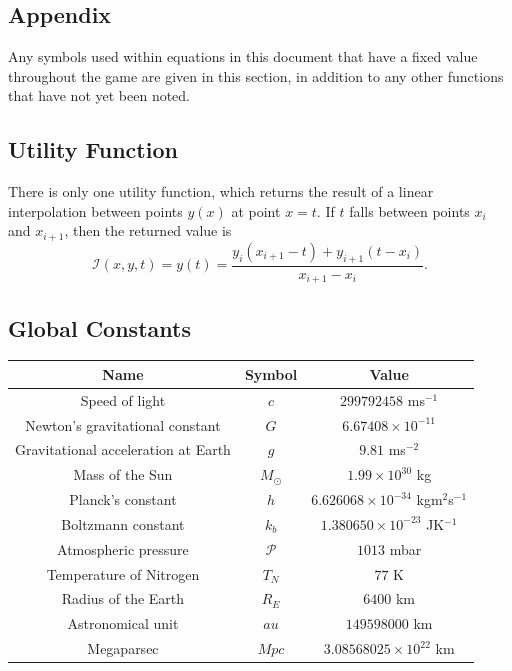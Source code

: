 \documentclass{article}
\begin{document}
\begin{appendix}
\section{Appendix}
Any symbols used within equations in this document that have a fixed
value throughout the game are given in this section, in addition to
any other functions that have not yet been noted.

\subsection{Utility Function}
There is only one utility function, which returns the result of a
linear interpolation between points $y(x)$ at point $x = t$. If $t$
falls between points $x_i$ and $x_{i+1}$, then the returned value is
\begin{equation}
    \mathcal{I}(x, y, t) = y(t) = \frac{y_i(x_{i+1} - t) + y_{i+1}(t - x_i)}{x_{i+1} - x_i}.
    \label{eq:lerp}
\end{equation}
\subsection{Global Constants}
\label{sec:constants}
\begin{center}
    \begin{tabular}{ |c|c|c| } 
     \hline
     \textbf{Name} & \textbf{Symbol}  & \textbf{Value}\\     
     \hline
     Speed of light  & $c$ & $299792458$ ms$^{-1}$\\ 
     \hline
     Newton's gravitational constant  & $G$ & $6.67408 \times 10^{-11}$\\ 
     \hline
     Gravitational acceleration at Earth  & $g$ & $9.81$ ms$^{-2}$\\ 
     \hline
     Mass of the Sun  & $M_{\odot}$ & $1.99 \times 10^{30}$ kg\\ 
     \hline
     Planck's constant  & $h$  & $6.626068 \times 10^{-34}$ kgm$^2$s$^{-1}$\\ 
     \hline
    Boltzmann constant  & $k_b$  & $1.380650 \times 10^{-23}$ JK$^{-1}$\\ 
    \hline
    Atmospheric pressure  & $\mathcal{P}$  & $1013$ mbar\\ 
    \hline
    Temperature of Nitrogen  & $T_N$  & $77$ K\\ 
    \hline
    Radius of the Earth & $R_E$ &  $6400$ km\\ 
    \hline
    Astronomical unit & $au$ &  $149598000$ km\\ 
    \hline
    Megaparsec & $Mpc$ & $3.08568025 \times 10^{22}$ km\\ 
    \hline
    \end{tabular}
\end{center}


\end{appendix}
\end{document}
